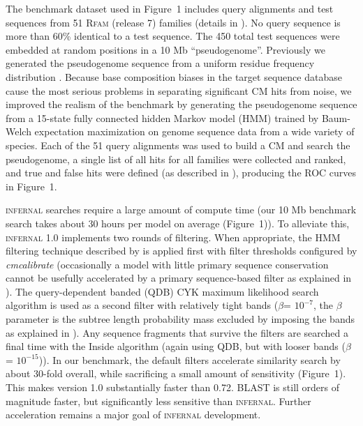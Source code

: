 \documentclass{bioinfo}
\begin{document}
\begin{application}
The benchmark dataset used in Figure~1 includes query alignments and
test sequences from 51 \textsc{Rfam} (release 7) families (details in
\citep{NawrockiEddy07}).  No query sequence is more than 60\% identical
to a test sequence.  The 450 total test sequences were embedded at
random positions in a 10 Mb ``pseudogenome''.  Previously we generated
the pseudogenome sequence from a uniform residue frequency
distribution \citep{NawrockiEddy07}.  Because base composition biases
in the target sequence database cause the most serious problems in
separating significant CM hits from noise, we improved the realism of
the benchmark by generating the pseudogenome sequence from a 15-state
fully connected hidden Markov model (HMM) trained by
Baum-Welch expectation maximization \citep{Durbin98} on genome
sequence data from a wide variety of species.  Each of the 51 query
alignments was used to build a CM and search the pseudogenome, a
single list of all hits for all families were collected and ranked,
and true and false hits were defined (as described in
\citet{NawrockiEddy07}), producing the ROC curves in Figure~1.

\textsc{infernal} searches require a large amount of compute time (our
10 Mb benchmark search takes about 30 hours per model on average
(Figure~1)). To alleviate this, \textsc{infernal} 1.0 implements two
rounds of filtering.  When appropriate, the HMM filtering technique
described by \citet{WeinbergRuzzo06} is applied first with filter
thresholds configured by \emph{cmcalibrate} (occasionally a model with
little primary sequence conservation cannot be usefully accelerated by
a primary sequence-based filter as explained in \citep{infguide03}).  The
query-dependent banded (QDB) CYK maximum likelihood search algorithm
is used as a second filter with relatively tight bands ($\beta$=
$10^{-7}$, the $\beta$ parameter is the subtree length probability
mass excluded by imposing the bands as explained in
\citep{NawrockiEddy07}).  Any sequence fragments that survive the
filters are searched a final time with the Inside algorithm (again
using QDB, but with looser bands ($\beta$= $10^{-15}$)).  In our
benchmark, the default filters accelerate similarity search by about
30-fold overall, while sacrificing a small amount of sensitivity
(Figure~1). This makes version 1.0 substantially faster than
0.72. \textsc{BLAST} is still orders of magnitude faster, but
significantly less sensitive than \textsc{infernal}. Further
acceleration remains a major goal of \textsc{infernal} development.


\end{application}
\end{document}
